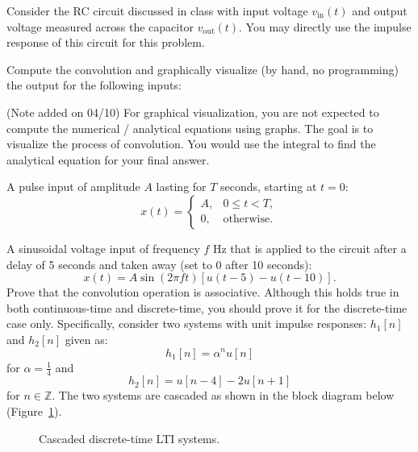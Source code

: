 \documentclass{ee102_pset}
\author{\rule{3cm}{0.4pt}} %
\begin{document}
Consider the RC circuit discussed in class with input voltage $v_{\text{in}}(t)$ and output voltage measured across the capacitor $v_{\text{out}}(t)$. You may directly use the impulse response of this circuit for this problem.

Compute the convolution and graphically visualize (by hand, no programming) the output for the following inputs:

{\color{blue} (Note added on 04/10) For graphical visualization, you are not expected to compute the numerical / analytical equations using graphs. The goal is to visualize the process of convolution. You would use the integral to find the analytical equation for your final answer.}

\problempart[20 points] A pulse input of amplitude $A$ lasting for $T$ seconds, starting at $t=0$:
\[
x(t) = \begin{cases}
A, & 0 \le t < T,\\
0, & \text{otherwise.}
\end{cases}
\]

\problempart[20 points] A sinusoidal voltage input of frequency $f$ Hz that is applied to the circuit after a delay of 5 seconds and taken away (set to 0 after 10 seconds):
\[
x(t) = A \sin(2 \pi f t) \left[u(t-5) - u(t-10)\right].
\]
Prove that the convolution operation is associative. Although this holds true in both continuous-time and discrete-time, you should prove it for the discrete-time case only. Specifically, consider two systems with unit impulse responses: $h_1[n]$ and $h_2[n]$ given as:
\[
h_1[n] = \alpha^n u[n]
\]
for $\alpha = \tfrac{1}{4}$ and 
\[
h_2[n] = u[n-4] - 2u[n+1]
\]
for $n \in \mathbb{Z}$. The two systems are cascaded as shown in the block diagram below (Figure~\ref{fig:cascade}). 
\begin{figure}[h]
  \centering
  \caption{Cascaded discrete-time LTI systems.}
  \label{fig:cascade}
\end{figure}
\end{document}
